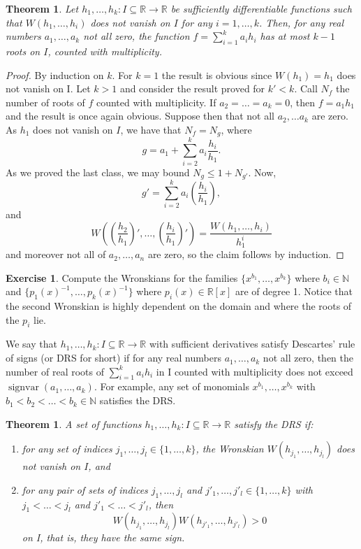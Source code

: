 \documentclass[11pt, a4paper]{article}
\newcommand{\NN}{\mathbb{N}}
\newcommand{\RR}{\mathbb{R}}
\DeclareMathOperator{\sv}{signvar}
\theoremstyle{plain}
\newtheorem{thm}[prop]{Theorem}
\theoremstyle{definition}
\newtheorem{ex}[prop]{Exercise}
\begin{document}
\begin{thm} Let $h_1,\dots,h_k:I\subseteq\RR\to\RR$ be sufficiently differentiable functions such that $W(h_1,\dots,h_i)$ does not vanish on $I$ for any $i=1,\dots,k$. Then, for any real numbers $a_1,\dots,a_k$ not all zero, the function $f=\sum_{i=1}^k a_ih_i$ has at most $k-1$ roots on $I$, counted with multiplicity.
\end{thm}
\begin{proof} By induction on $k$. For $k=1$ the result is obvious since $W(h_1)=h_1$ does not vanish on I.
Let $k>1$ and consider the result proved for $k'<k$. Call $N_f$ the number of roots of $f$ counted with multiplicity. If $a_2=\dots=a_k=0$, then $f=a_1h_1$ and the result is once again obvious. Suppose then that not all $a_2,\dots a_k$ are zero. As $h_1$ does not vanish on $I$, we have that $N_f=N_g$, where
\[g=a_1+\sum_{i=2}^k a_i \frac{h_i}{h_1}.\]
As we proved the last class, we may bound $N_g\leq 1+ N_{g'}$. Now, 
\[g'=\sum_{i=2}^k a_i \left(\frac{h_i}{h_1}\right),\]
and 
\[W\left(\left(\frac{h_2}{h_1}\right)',\dots, \left(\frac{h_i}{h_1}\right)'\right) = \frac{W(h_1,\dots,h_i)}{h_1^i} \]
and moreover not all of $a_2,\dots, a_n$ are zero, so the claim follows by induction.
\end{proof}

\begin{ex} Compute the Wronskians for the families $\{x^{b_1},\dots,x^{b_k}\}$ where $b_i\in \NN$ and $\{p_1(x)^{-1},\dots,p_k(x)^{-1}\}$ where $p_i(x)\in \RR[x]$ are of degree 1. Notice that the second Wronskian is highly dependent on the domain and where the roots of the $p_i$ lie.
\end{ex}

We say that $h_1,\dots,h_k:I\subseteq\RR\to\RR$ with sufficient derivatives satisfy Descartes' rule of signs (or DRS for short) if for any real numbers $a_1,\dots, a_k$ not all zero, then the number of real roots of $\sum_{i=1}^k a_ih_i$ in I counted with multiplicity does not exceed $\sv(a_1,\dots,a_k)$. For example, any set of monomials $x^{b_1},\dots, x^{b_k}$ with $b_1<b_2<\dots<b_k\in\NN$ satisfies the DRS.

\begin{thm} A set of functions $h_1,\dots,h_k:I\subseteq\RR\to\RR$ satisfy the DRS if:
\begin{enumerate}
\item for any set of indices $j_1,\dots, j_l\in\{1,\dots,k\}$, the Wronskian $W(h_{j_1},\dots,h_{j_l})$ does not vanish on $I$, and
\item for any pair of sets of indices $j_1,\dots, j_l$ and $j'_1,\dots, j'_l\in\{1,\dots,k\}$ with $j_1<\dots<j_l$ and $j'_1<\dots<j'_l$, then
\[W(h_{j_1},\dots,h_{j_l})W(h_{j'_1},\dots,h_{j'_l})>0\]
on I, that is, they have the same sign.
\end{enumerate}
\end{thm}
\end{document}
